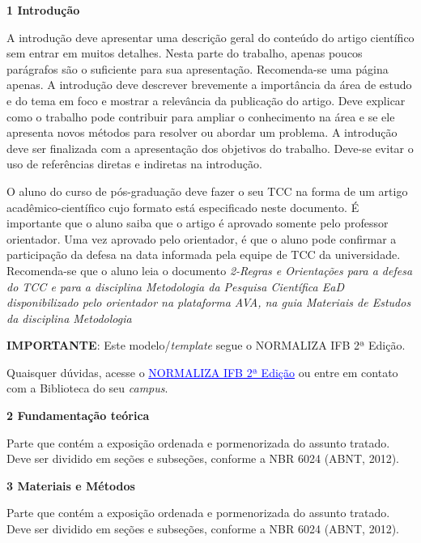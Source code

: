 \documentclass[a4paper, 12pt, oneside] {article}
\begin{document}
\noindent \textbf {1 Introdução}
\singlespacing

\par A introdução deve apresentar uma descrição geral do conteúdo do artigo científico sem entrar em muitos detalhes. Nesta parte do trabalho, apenas poucos parágrafos são o suficiente para sua apresentação. Recomenda-se uma página apenas. A introdução deve descrever brevemente a importância da área de estudo e do tema em foco e mostrar a relevância da publicação do artigo. Deve explicar como o trabalho pode contribuir para ampliar o conhecimento na área e se ele apresenta novos métodos para resolver ou abordar um problema. A introdução deve ser finalizada com a apresentação dos objetivos do trabalho. Deve-se evitar o uso de referências diretas e indiretas na introdução.

    \par O aluno do curso de pós-graduação deve fazer o seu TCC na forma de um artigo acadêmico-científico cujo formato está especificado neste documento. É importante que o aluno saiba que o artigo é aprovado somente pelo professor orientador. Uma vez aprovado pelo orientador, é que o aluno pode confirmar a participação da defesa na data informada pela equipe de TCC da universidade. Recomenda-se que o aluno leia o documento \textit{2-Regras e Orientações para a defesa do TCC e para a disciplina Metodologia da Pesquisa Científica EaD disponibilizado pelo orientador na plataforma AVA, na guia Materiais de Estudos da disciplina Metodologia}

\par \textbf{IMPORTANTE}: Este modelo/\textit{template} segue o NORMALIZA IFB 2ª Edição. 

\par Quaisquer dúvidas, acesse o \textcolor{blue}{\underline{NORMALIZA IFB 2ª Edição}} ou entre em contato com a Biblioteca do seu \textit{campus}.
\singlespacing


\noindent \textbf{2 Fundamentação teórica}

\par [OBRIGATÓRIO] Parte que contém a exposição ordenada e pormenorizada do assunto tratado. Deve ser dividido em seções e subseções, conforme a NBR 6024 (ABNT, 2012).
\singlespacing

\noindent \textbf{3 Materiais e Métodos}

\par [OBRIGATÓRIO] Parte que contém a exposição ordenada e pormenorizada do assunto tratado. Deve ser dividido em seções e subseções, conforme a NBR 6024 (ABNT, 2012).
\singlespacing
\end{document}
